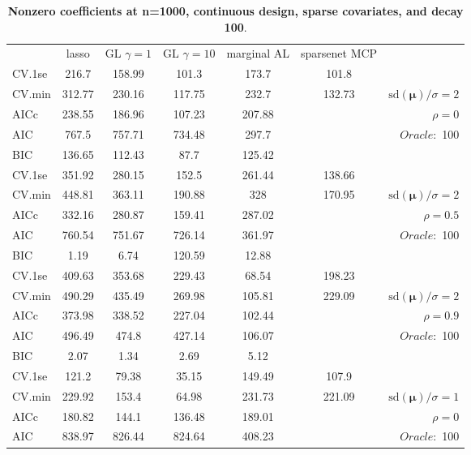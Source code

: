 \clearpage
\begin{table}\vspace{-.5cm}
\caption[l]{ { \bf Nonzero coefficients at n=1000, continuous design, 
sparse covariates, and  decay  100}.}
\vspace{-.5cm}
\footnotesize{}
\begin{center}
\begin{tabular}{l*{5}{c}|r}
& lasso & GL $\gamma=1$ & GL $\gamma=10$ & marginal AL & sparsenet MCP  & \\
 \cline{1-7}
CV.1se & 216.7 & 158.99 & 101.3 & 173.7 & 101.8 & \\
CV.min & 312.77 & 230.16 & 117.75 & 232.7 & 132.73 &  $\mathrm{sd}(\mathbf{\mu})/\sigma=2$ \\
AICc & 238.55 & 186.96 & 107.23 & 207.88 & & $\rho=0$ \\
AIC & 767.5 & 757.71 & 734.48 & 297.7 & &  \multirow{2}{*}{$Oracle: $ 100} \\
BIC & 136.65 & 112.43 & 87.7 & 125.42 & &  \\
 \hline 
CV.1se & 351.92 & 280.15 & 152.5 & 261.44 & 138.66 & \\
CV.min & 448.81 & 363.11 & 190.88 & 328 & 170.95 &  $\mathrm{sd}(\mathbf{\mu})/\sigma=2$ \\
AICc & 332.16 & 280.87 & 159.41 & 287.02 & & $\rho=0.5$ \\
AIC & 760.54 & 751.67 & 726.14 & 361.97 & &  \multirow{2}{*}{$Oracle: $ 100} \\
BIC & 1.19 & 6.74 & 120.59 & 12.88 & &  \\
 \hline 
CV.1se & 409.63 & 353.68 & 229.43 & 68.54 & 198.23 & \\
CV.min & 490.29 & 435.49 & 269.98 & 105.81 & 229.09 &  $\mathrm{sd}(\mathbf{\mu})/\sigma=2$ \\
AICc & 373.98 & 338.52 & 227.04 & 102.44 & & $\rho=0.9$ \\
AIC & 496.49 & 474.8 & 427.14 & 106.07 & &  \multirow{2}{*}{$Oracle: $ 100} \\
BIC & 2.07 & 1.34 & 2.69 & 5.12 & &  \\
 \hline 
CV.1se & 121.2 & 79.38 & 35.15 & 149.49 & 107.9 & \\
CV.min & 229.92 & 153.4 & 64.98 & 231.73 & 221.09 &  $\mathrm{sd}(\mathbf{\mu})/\sigma=1$ \\
AICc & 180.82 & 144.1 & 136.48 & 189.01 & & $\rho=0$ \\
AIC & 838.97 & 826.44 & 824.64 & 408.23 & &  \multirow{2}{*}{$Oracle: $ 100} \\

\end{tabular}
\end{center}
\end{table}
